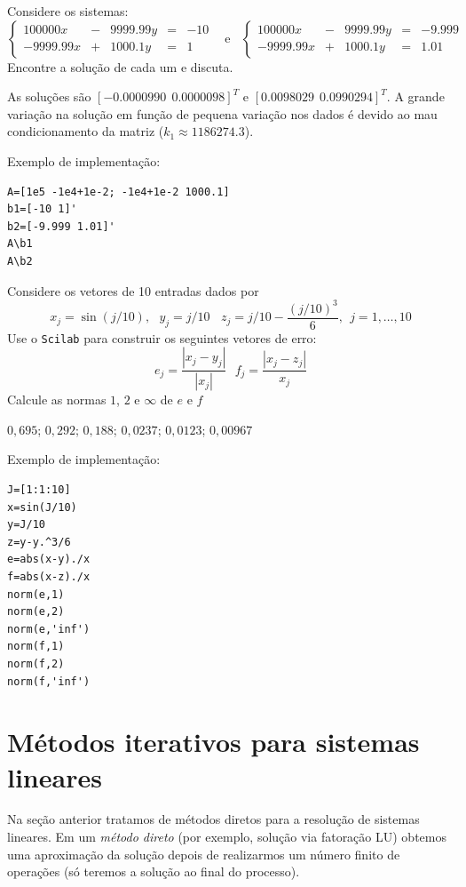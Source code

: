 \begin{exer} Considere os sistemas:
$$
\left\{
\begin{array}{rclcl}
100000 x  &-& 9999.99 y  &=&-10\\
-9999.99 x &+&  1000.1 y &=&1
\end{array}\right. ~~~~\text{e}~~~~
\left\{
\begin{array}{rclcl}
100000 x  &-& 9999.99 y  &=&-9.999\\
-9999.99 x &+&  1000.1 y &=&1.01
\end{array}\right.
$$
Encontre a solução de cada um e discuta.
\end{exer}
\begin{resp}
  
As soluções são $[-0.0000990 ~~ 0.0000098]^T$ e $[0.0098029 ~~ 0.0990294]^T$. A grande variação na solução em função de pequena variação nos dados é devido ao mau condicionamento da matriz ($k_1\approx 1186274.3 $).

Exemplo de implementação:
\begin{verbatim}
A=[1e5 -1e4+1e-2; -1e4+1e-2 1000.1]
b1=[-10 1]'
b2=[-9.999 1.01]'
A\b1
A\b2
\end{verbatim}    
  
\end{resp}

\begin{exer} Considere os vetores de 10 entradas dados por $$x_j=\sin(j/10),~~~y_j=j/10~~~~z_j=j/10-\frac{\left(j/10\right)^3}{6},~~ j=1,\ldots,10$$
Use o \verb+Scilab+ para construir os seguintes vetores de erro:
$$e_{j}=\frac{|x_j-y_j|}{|x_j|}~~~ f_j=\frac{|x_j-z_j|}{x_j}$$
Calcule as normas $1$, $2$ e $\infty$ de $e$ e $f$
\end{exer}
\begin{resp}
  
$0,695$; $0,292$; $0,188$;  $0,0237$; $0,0123$; $0,00967$

\ifisscilab
Exemplo de implementação:
\begin{verbatim}
J=[1:1:10]
x=sin(J/10)
y=J/10
z=y-y.^3/6
e=abs(x-y)./x
f=abs(x-z)./x
norm(e,1)
norm(e,2)
norm(e,'inf')
norm(f,1)
norm(f,2)
norm(f,'inf')
\end{verbatim}
\fi    
  
\end{resp}



\section{Métodos iterativos para sistemas lineares}
Na seção anterior tratamos de métodos diretos para a resolução de sistemas lineares. Em um \emph{método direto} (por exemplo, solução via fatoração LU) obtemos uma aproximação da solução depois de realizarmos um número finito de operações (só teremos a solução ao final do processo).

